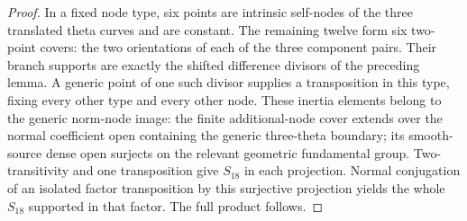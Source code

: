 \begin{proof}
In a fixed node type, six points are intrinsic self-nodes of the
three translated theta curves and are constant. The remaining
twelve form six two-point covers: the two orientations of each
of the three component pairs. Their branch supports are exactly
the shifted difference divisors of the preceding lemma. A
generic point of one such divisor supplies a transposition in
this type, fixing every other type and every other node.
These inertia elements belong to the generic norm-node image:
the finite \etale additional-node cover extends over the normal
coefficient open containing the generic three-theta boundary;
its smooth-source dense open surjects on the relevant geometric
fundamental group. Two-transitivity and one transposition give
$S_{18}$ in each projection. Normal conjugation of an isolated
factor transposition by this surjective projection yields the
whole $S_{18}$ supported in that factor. The full product follows.
\end{proof}

